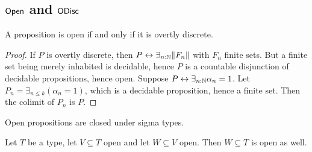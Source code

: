 
\subsection{$\mathsf{Open}$ and $\mathsf{ODisc}$} %
\begin{lemma}\label{PropOpenIffOdisc}
  A proposition is open if and only if it is overtly discrete.
\end{lemma}
\begin{proof}
  If $P$ is overtly discrete, then $P\leftrightarrow \exists_{n:\mathbb{N}} \lVert F_n \rVert$ with $F_n$ finite sets. 
  But a finite set being merely inhabited is decidable, hence $P$ is a countable disjunction of decidable propositions, hence open.
  Suppose $P\leftrightarrow \exists_{n:\mathbb{N}} \alpha_n = 1$. 
  Let $P_n = \exists_{n\leq k} (\alpha_n = 1)$, which is a decidable proposition, hence a finite set. 
  Then the colimit of $P_n$ is $P$. 
\end{proof}

\begin{corollary}\label{OpenDependentSums}
  Open propositions are closed under sigma types. 
\end{corollary}
\begin{corollary}\label{OpenTransitive}
  Let $T$ be a type, let $V\subseteq T$ open and let $W\subseteq V$ open. 
  Then $W\subseteq T$ is open as well. 
\end{corollary}

